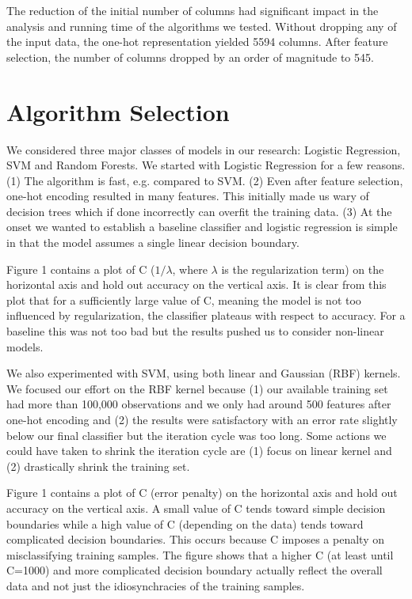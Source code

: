 \documentclass[twoside,11pt]{homework}
\begin{document}
The reduction of the initial number of columns had significant impact in the analysis and running time of the algorithms we tested. Without dropping any of the input data, the one-hot representation yielded 5594 columns. After feature selection, the number of columns dropped by an order of magnitude to 545.  


\section*{Algorithm Selection}



We considered three major classes of models in our research: Logistic Regression,
SVM and Random Forests. We started with Logistic Regression for a few reasons.
(1) The algorithm is fast, e.g. compared to SVM.
(2) Even after feature selection, one-hot encoding resulted in 
many features. This initially made us wary of decision trees which if done 
incorrectly can overfit the training data.
(3) At the onset we wanted to establish a baseline classifier and logistic regression is simple in that the model assumes a single linear 
decision boundary. 

Figure 1 contains a plot of C ($1/\lambda$, where $\lambda$ is the regularization term) on the horizontal axis and hold out accuracy on the vertical axis.
It is clear from this plot that for a sufficiently large value of C, meaning the model is not too influenced by regularization,
the classifier plateaus with respect to accuracy. For a baseline this was not too bad but the results pushed us
to consider non-linear models. 

We also experimented with SVM, using both linear and Gaussian (RBF) kernels. We 
focused our effort on the RBF kernel because (1) our available training set had more 
than 100,000 observations and we only had around 500 features after one-hot 
encoding and (2) the results were satisfactory with an error rate slightly below 
our final classifier but the iteration cycle was too long. Some actions we could have 
taken to shrink the iteration cycle are (1) focus on linear kernel and (2) drastically 
shrink the training set.

Figure 1 contains a plot of C (error penalty) on the horizontal axis and hold out accuracy on the vertical axis.
A small value of C tends toward simple decision boundaries while a high value of C (depending on the data) tends toward complicated
decision boundaries. This occurs because C imposes a penalty on misclassifying training samples.
The figure shows that a higher C (at least until C=1000) and more complicated decision boundary actually reflect the overall data
and not just the idiosynchracies of the training samples.
\end{document}
